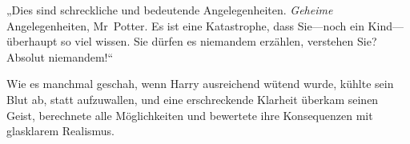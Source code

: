 „Dies sind schreckliche und bedeutende Angelegenheiten. \emph{Geheime} Angelegenheiten, Mr~Potter. Es ist eine Katastrophe, dass Sie—noch ein Kind—überhaupt so viel wissen. Sie dürfen es niemandem erzählen, verstehen Sie? Absolut niemandem!“

Wie es manchmal geschah, wenn Harry ausreichend wütend wurde, kühlte sein Blut ab, statt aufzuwallen, und eine erschreckende Klarheit überkam seinen Geist, berechnete alle Möglichkeiten und bewertete ihre Konsequenzen mit glasklarem Realismus.

